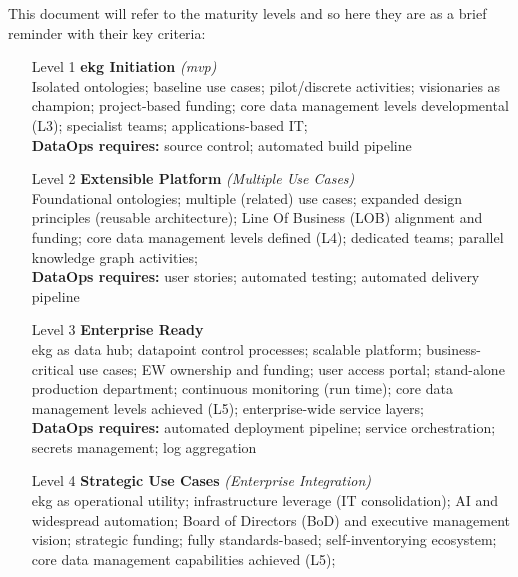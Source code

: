 %
%
This document will refer to the maturity levels and so here they are as a brief reminder with their key criteria:

\begin{itemize}[leftmargin=0.5in,font=\bfseries]

    \item [Level 1] \textbf{\acrshort{ekg} Initiation} \textit{(\acrfull{mvp})}
    ~\\Isolated ontologies;
    baseline use cases;
    pilot/discrete activities;
    visionaries as champion;
    project-based funding;
    core data management levels developmental (L3);
    specialist teams;
    applications-based IT;\\[1em]
    \textbf{DataOps requires:}
        source control;
        automated build pipeline\\[0.5em]

    \item [Level 2] \textbf{Extensible Platform} \textit{(Multiple Use Cases)}
    ~\\Foundational ontologies;
    multiple (related) use cases;
    expanded design principles (reusable architecture);
    Line Of Business (LOB) alignment and funding;
    core data management levels defined (L4);
    dedicated teams;
    parallel knowledge graph activities;\\[1em]
    \textbf{DataOps requires:}
        user stories;
        automated testing;
        automated delivery pipeline\\[0.5em]

    \item [Level 3] \textbf{Enterprise Ready}
    ~\\\acrshort{ekg} as data hub;
    datapoint control processes;
    scalable platform;
    business-critical use cases;
    EW ownership and funding;
    user access portal;
    stand-alone production department;
    continuous monitoring (run time);
    core data management levels achieved (L5);
    enterprise-wide service layers;\\[1em]
    \textbf{DataOps requires:}
        automated deployment pipeline;
        service orchestration;
        secrets management;
        log aggregation\\[0.5em]

    \item [Level 4] \textbf{Strategic Use Cases} \textit{(Enterprise Integration)}
    ~\\\acrshort{ekg} as operational utility;
    infrastructure leverage (IT consolidation);
    AI and widespread automation;
    Board of Directors (BoD) and executive management vision;
    strategic funding;
    fully standards-based;
    self-inventorying ecosystem;
    core data management capabilities achieved (L5);\\[0.5em]


\end{itemize}
